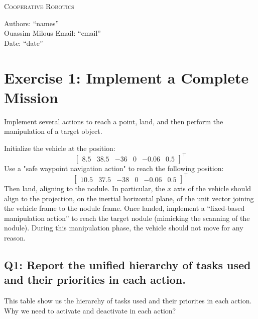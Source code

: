 \documentclass{article}
\makeatletter
\newcommand\frontmatter{%
    \cleardoublepage
  \pagenumbering{roman}}
\makeatother
\begin{document}
\frontmatter
\onecolumn 
\vskip 1cm
\begin{center}
\huge \textsc{Cooperative Robotics}\\
\vskip 1cm

\skip 0.5cm

\vskip 5cm

\normalsize
Authors: ``names'' \\
Ouassim Milous
Email: ``email'' \\
Date: ``date'' \\
\end{center}
\clearpage
\section{Exercise 1: Implement a Complete Mission}
Implement several actions to reach a point, land, and then perform the manipulation of a target object.

Initialize the vehicle at the position:
\begin{displaymath}
	\begin{bmatrix} 8.5 & 38.5 & -36 & 0 & -0.06 & 0.5 \end{bmatrix}^\top
\end{displaymath} 
Use a "safe waypoint navigation action" to reach the following position: 
\begin{displaymath}
	\begin{bmatrix} 10.5 & 37.5 & -38 & 0 & -0.06 & 0.5 \end{bmatrix}^\top
\end{displaymath} 
Then land, aligning to the nodule. In particular, the $x$ axis of the vehicle should align to the projection, on the inertial horizontal plane, of the unit vector joining the vehicle frame to the nodule frame.
Once landed, implement a ``fixed-based manipulation action'' to reach the target nodule (mimicking the scanning of the nodule). During this manipulation phase, the vehicle should not move for any reason.

\subsection{Q1: Report the unified hierarchy of tasks used and their priorities in each action.}

This table show us the hierarchy of tasks used and their priorites in each action.
Why we need to activate and deactivate in each action?
\end{document}
